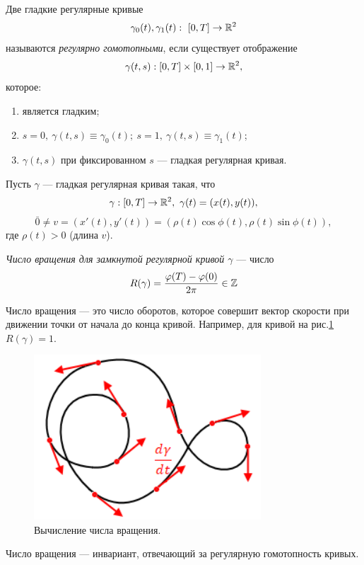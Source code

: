 \begin{definition}
    Две гладкие регулярные кривые $$\gamma_0(t), \gamma_1(t): \ [0, T] \to \mathbb{R}^2$$ называются \textit{регулярно гомотопными}, если существует отображение $$\gamma(t,s): [0, T] \times [0,1] \to \mathbb{R}^2,$$ которое:
    \begin{enumerate}
        \item является гладким;
        \item $s = 0, \ \gamma(t,s) \equiv \gamma_0(t); \ s = 1,\ \gamma(t,s) \equiv \gamma_1(t)$;
        \item $\gamma(t,s)$ при фиксированном $s$ — гладкая регулярная кривая.
    \end{enumerate}
\end{definition} 


Пусть $\gamma$ — гладкая регулярная кривая такая, что $$\gamma: [0, T] \to \mathbb{R}^2,\ \gamma(t) = (x(t), y(t)),$$ $$\bar{0} \neq v = (x'(t), y'(t)) = (\rho(t) \cos{\phi(t)}, \rho(t) \sin{\phi(t)}),$$ где $\rho(t) > 0$ (длина $v$).

\begin{definition}
    \textit{Число вращения для замкнутой регулярной кривой $\gamma$} — число $$R(\gamma) = \frac{\varphi(T) - \varphi(0)}{2 \pi} \in \mathbb{Z}$$
\end{definition}

\begin{remark}
    Число вращения — это число оборотов, которое совершит вектор скорости при движении точки от начала до конца кривой.
    Например, для кривой на рис.\ref{fig:c12.5} $R(\gamma) = 1$.
    \begin{figure}[htbp]
        \centering
        \includegraphics[scale=0.7]{images/c12.5.png}
        \caption{Вычисление числа вращения.}
        \label{fig:c12.5}
    \end{figure}
\end{remark}

\begin{remark}
    Число вращения — инвариант, отвечающий за регулярную гомотопность кривых.
\end{remark}

